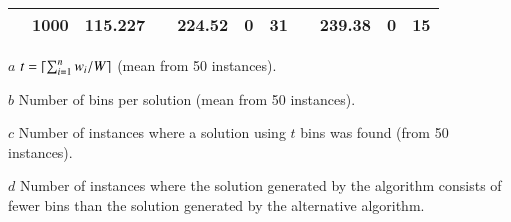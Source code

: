 \documentclass[authoryear]{elsarticle}
\begin{document}
\begin{table}[h!]
\begin{threeparttable}
\begin{tabular}{lrrcrrrcrrr}
	& 1000 & 115.227 && 224.52 & 0 & 31 && 239.38 & 0 & 15 \\
	\bottomrule
\end{tabular}
\vspace{0.2cm} %
\begin{tablenotes}
	\item[$a$] $t = \lceil\sum_{i=1}^{n} w_i / W\rceil$ (mean from 50 instances).
	\item[$b$] Number of bins per solution (mean from 50 instances).
	\item[$c$] Number of instances where a solution using $t$ bins was found (from 50 instances).
	\item[$d$] Number of instances where the solution generated by the algorithm consists of fewer bins than the solution generated by the alternative algorithm.
\end{tablenotes}	
\end{threeparttable}	
\label{table:cmsa}
\end{table}

\begin{comment}
{\color{myGreen}
\begin{itemize}[leftmargin=*]
	\item Designed to not search for all covers, only minimum one, so recursion is restricted to as many levels as the best solution found so far.
	\item Ran EA on those 50 instances for an hour to compare fairly, and best solution from the three recombination operators is chosen.	
	\item $\mathcal{B}$ does not include duplicates.
	\item If no solution found within 600 seconds, set $\mathcal{S}^* \gets \mathcal{S}_{bsf}$, unless first iteration of CMSA and $\mathcal{S}_{bsf} \gets \emptyset$, then keep going until one solution found.
	\item When comparing in line 9, the ``better than'' is done by comparing the number of bins first and choosing solution with fewest bins, otherwise if number of bins equal then compare fitness values.
	\item Zenodo citation.
	\item From decision problem to optimisation problem.
	\item Compare by fitness value if number of bins equal in RS.
\end{itemize}
}
\end{comment}

\end{document}
